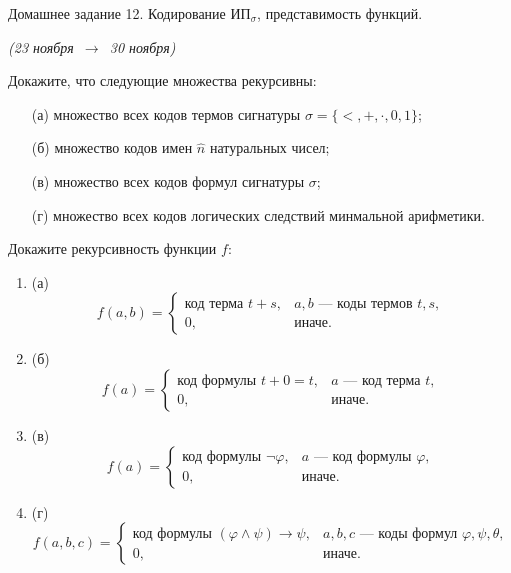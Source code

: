 \documentclass[a4paper,11pt]{article}
\begin{document}
   \newcommand{\enumsep}{\vspace{-2.8mm}
   		\begin{enumerate}[itemsep=0.4mm,leftmargin=2.5mm]}

\begin{center}
	{\Large Домашнее задание 12. Кодирование \(\text{ИП}_{\sigma}\), представимость функций.}

	{\it (23 ноября\ \(\to\)\ 30 ноября)}
\end{center}


   \item Докажите, что следующие множества рекурсивны: \enumsep
	\item[(а)] множество всех кодов термов сигнатуры $\sigma=\{<,+,\cdot,0,1\}$; 
	\item[(б)] множество кодов имен $\widehat{n}$ натуральных чисел; 
	\item[(в)] множество всех кодов формул сигнатуры $\sigma$;
	\item[(г)] множество всех кодов логических следствий минмальной арифметики.
	   \end{enumerate}

   \item Докажите рекурсивность функции $f$: \enumsep
	\item[(а)] \[ f(a,b) = \begin{cases} \text{код терма }t+s,& a,b\text{ — коды термов }t,s, \\ 0,& \text{иначе.} \end{cases} \]
	\item[(б)] \[ f(a) = \begin{cases} \text{код формулы }t+0=t,& a\text{ — код терма }t, \\ 0,& \text{иначе.} \end{cases} \]
	\item[(в)] \[ f(a) = \begin{cases} \text{код формулы }\neg\varphi,& a\text{ — код формулы }\varphi, \\ 0,& \text{иначе.} \end{cases} \]
	\item[(г)] \[ f(a,b,c) = \begin{cases} \text{код формулы }(\varphi\land\psi)\to\psi,& a,b,c\text{ — коды формул }\varphi, \psi, \theta, \\ 0,& \text{иначе.} \end{cases} \] \end{enumerate}
\end{document}
